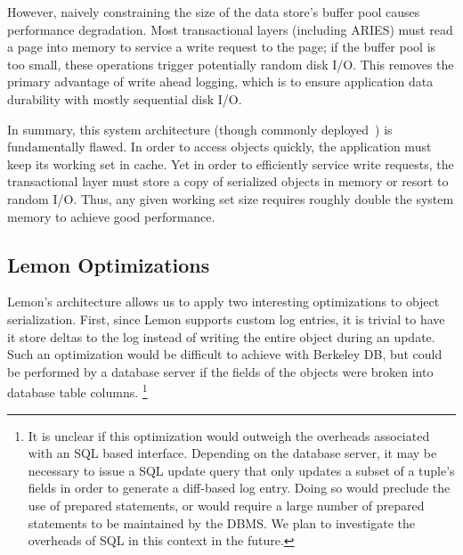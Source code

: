 \documentclass[letterpaper,twocolumn,english]{article}
\newcommand{\yad}{Lemon\xspace}
\begin{document}
However, naively constraining the size of the data store's buffer pool
causes performance degradation. Most transactional layers 
(including ARIES) must read a page
into memory to service a write request to the page; if the buffer pool
is too small, these operations trigger potentially random disk I/O. 
This removes the primary
advantage of write ahead logging, which is to ensure application data
durability with mostly sequential disk I/O.

In summary, this system architecture (though commonly
deployed~\cite{ejb,ordbms,jdo,...}) is fundamentally
flawed.  In order to access objects quickly, the application must keep
its working set in cache.  Yet in order to efficiently service write 
requests, the
transactional layer must store a copy of serialized objects
in memory or resort to random I/O.  
Thus, any given working set size requires roughly double the system
memory to achieve good performance.

\subsection{\yad Optimizations}

\yad's architecture allows us to apply two interesting optimizations
to object serialization.  First, since \yad supports
custom log entries, it is trivial to have it store deltas to
the log instead of writing the entire object during an update.
Such an optimization would be difficult to achieve with Berkeley DB,
but could be performed by a database server if the fields of the
objects were broken into database table columns. 
\footnote{It is unclear if
this optimization would outweigh the overheads associated with an SQL
based interface.  Depending on the database server, it may be
necessary to issue a SQL update query that only updates a subset of a
tuple's fields in order to generate a diff-based log entry.  Doing so
would preclude the use of prepared statements, or would require a large
number of prepared statements to be maintained by the DBMS. We plan to
investigate the overheads of SQL in this context in the future.}

\end{document}
